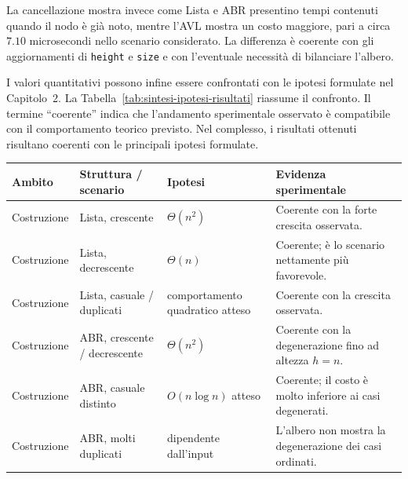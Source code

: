 \documentclass[a4paper,11pt]{article}
\begin{document}
La cancellazione mostra invece come Lista e ABR presentino tempi contenuti quando il nodo è già noto, mentre l'AVL mostra un costo maggiore, pari a circa $7.10$ microsecondi nello scenario considerato. La differenza è coerente con gli aggiornamenti di \texttt{height} e \texttt{size} e con l'eventuale necessità di bilanciare l'albero.

I valori quantitativi possono infine essere confrontati con le ipotesi formulate nel Capitolo~2. La Tabella~\ref{tab:sintesi-ipotesi-risultati} riassume il confronto. Il termine ``coerente'' indica che l'andamento sperimentale osservato è compatibile con il comportamento teorico previsto. Nel complesso, i risultati ottenuti risultano coerenti con le principali ipotesi formulate.

\begin{table}[H]
    \centering
    \small

    \begin{tabular}{
        p{2.4cm}
        p{2.6cm}
        p{3.4cm}
        p{5.0cm}
    }
        \toprule
        Ambito
        & Struttura / scenario
        & Ipotesi
        & Evidenza sperimentale \\
        \midrule

        Costruzione
        & Lista, crescente
        & $\Theta(n^2)$
        & Coerente con la forte crescita osservata. \\

        Costruzione
        & Lista, decrescente
        & $\Theta(n)$
        & Coerente; è lo scenario nettamente più favorevole. \\

        Costruzione
        & Lista, casuale / duplicati
        & comportamento quadratico atteso
        & Coerente con la crescita osservata. \\

        Costruzione
        & ABR, crescente / decrescente
        & $\Theta(n^2)$
        & Coerente con la degenerazione fino ad altezza $h=n$. \\

        Costruzione
        & ABR, casuale distinto
        & $O(n\log n)$ atteso
        & Coerente; il costo è molto inferiore ai casi degenerati. \\

        Costruzione
        & ABR, molti duplicati
        & dipendente dall'input
        & L'albero non mostra la degenerazione dei casi ordinati. \\


\end{tabular}
\end{table}
\end{document}

